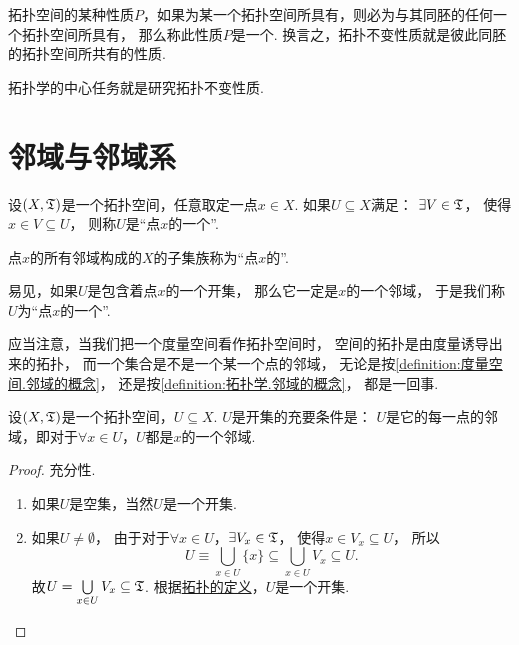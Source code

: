 拓扑空间的某种性质\(P\)，如果为某一个拓扑空间所具有，则必为与其同胚的任何一个拓扑空间所具有，%
那么称此性质\(P\)是一个.
换言之，拓扑不变性质就是彼此同胚的拓扑空间所共有的性质.

{\color{red} 拓扑学的中心任务就是研究拓扑不变性质.}

\section{邻域与邻域系}
\begin{definition}\label{definition:拓扑学.邻域的概念}
设\((X,\mathfrak T)\)是一个拓扑空间，任意取定一点\(x \in X\).
如果\(U \subseteq X\)满足：
\(\exists V \in \mathfrak T\)，
使得\(x \in V \subseteq U\)，
则称\(U\)是“点\(x\)的一个”.

点\(x\)的所有邻域构成的\(X\)的子集族称为“点\(x\)的”.
\end{definition}

易见，如果\(U\)是包含着点\(x\)的一个开集，
那么它一定是\(x\)的一个邻域，
于是我们称\(U\)为“点\(x\)的一个”.

应当注意，当我们把一个度量空间看作拓扑空间时，
空间的拓扑是由度量诱导出来的拓扑，
而一个集合是不是一个某一个点的邻域，
无论是按\cref{definition:度量空间.邻域的概念}，
还是按\cref{definition:拓扑学.邻域的概念}，
都是一回事.

\begin{theorem}\label{theorem:拓扑学.成为开集的充要条件1}
设\((X,\mathfrak T)\)是一个拓扑空间，\(U \subseteq X\).
\(U\)是开集的充要条件是：
\(U\)是它的每一点的邻域，即对于\(\forall x \in U\)，\(U\)都是\(x\)的一个邻域.
\begin{proof}
充分性.
\begin{enumerate}
	\item 如果\(U\)是空集，当然\(U\)是一个开集.

	\item 如果\(U\neq\emptyset\)，
	由于对于\(\forall x \in U\)，\(\exists V_x \in \mathfrak T\)，
	使得\(x \in V_x \subseteq U\)，
	所以\[
	U \equiv \bigcup\limits_{x \in U} \{ x \}
	\subseteq \bigcup\limits_{x \in U} V_x
	\subseteq U.
	\]
	故\(U = \bigcup\limits_{x \in U} V_x \subseteq \mathfrak T\).
	根据\hyperref[definition:拓扑学.开集公理定义的拓扑空间]{拓扑的定义}，\(U\)是一个开集.
	\qedhere
\end{enumerate}
\end{proof}
\end{theorem}

